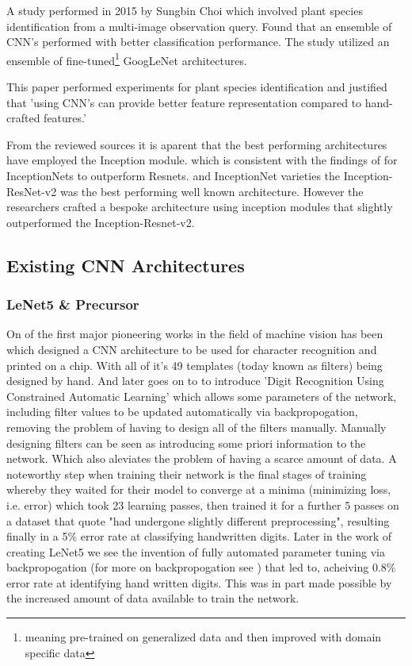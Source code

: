     \par
    A study performed in 2015 by Sungbin Choi \citep{Choi} which involved plant species identification from a multi-image observation query. Found that an ensemble of CNN's performed with better classification performance. The study utilized an ensemble of fine-tuned\footnote[2]{meaning pre-trained on generalized data and then improved with domain specific data} GoogLeNet architectures.
    \par
    This paper \citep{Zhu2018} performed experiments for plant species identification and justified that 'using CNN's can provide better feature representation compared to hand-crafted features.' %
    \par
    From the reviewed sources it is aparent that the best performing architectures have employed the Inception \citep{Szegedy2015} module. which is consistent with the findings of \citep{Wu2019} for InceptionNets to outperform Resnets.  %
   \citep{He} and InceptionNet varieties the Inception-ResNet-v2 was the best performing well known architecture. However the researchers crafted a bespoke architecture using inception modules that slightly outperformed the Inception-Resnet-v2. %
  \subsection{Existing CNN Architectures}
  \subsubsection{LeNet5 \& Precursor}
    On of the first major pioneering works in the field of machine vision has been \citep{Cun1989} which designed a CNN architecture to be used for character recognition and printed on a chip. With all of it's 49 templates (today known as filters) being designed by hand. And later goes on to to introduce 'Digit Recognition Using Constrained Automatic Learning' which allows some parameters of the network, including filter values to be updated automatically via backpropogation, removing the problem of having to design all of the filters manually. Manually designing filters can be seen as introducing some priori information to the network. Which also aleviates the problem of having a scarce amount of data. A noteworthy step when training their network is the final stages of training whereby they waited for their model to converge at a minima (minimizing loss, i.e. error) which took 23 learning passes, then trained it for a further 5 passes on a dataset that quote "had undergone slightly different preprocessing", resulting finally in a 5\% error rate at classifying handwritten digits. Later in the work of creating LeNet5 \citep{LeCun1998} we see the invention of fully automated parameter tuning via backpropogation (for more on backpropogation see \citep{CunYannle1988}) that led to, acheiving 0.8\% error rate at identifying hand written digits. This was in part made possible by the increased amount of data available to train the network.
    \par

